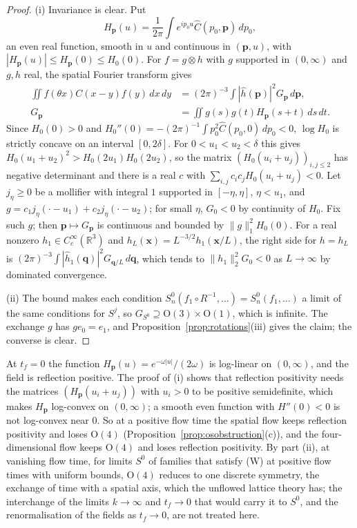 \documentclass[aps,prd,twocolumn,superscriptaddress,nofootinbib,longbibliography,floatfix,amsmath,amssymb,10pt]{revtex4-2}
\theoremstyle{definition}
\theoremstyle{remark}
\newcommand{\R}{\mathbb{R}}
\begin{document}
\begin{proof}
(i) Invariance is clear. Put
\[
H_{\mathbf p}(u)=\frac1{2\pi}\int e^{ip_0u}\widehat C(p_0,\mathbf p)
\,dp_0 ,
\]
an even real function, smooth
in $u$ and continuous in $(\mathbf p,u)$, with $|H_{\mathbf p}(u)|\le
H_{\mathbf p}(0)\le H_0(0)$. For $f=g\otimes h$ with $g$ supported in
$(0,\infty)$ and $g,h$ real, the spatial Fourier transform gives
\[
\begin{split}
\iint f(\theta x)C(x-y)f(y)\,dx\,dy
&=(2\pi)^{-3}\!\int|\hat h(\mathbf p)|^2G_{\mathbf p}\,d\mathbf p,\\
G_{\mathbf p}&=\iint g(s)g(t)H_{\mathbf p}(s+t)\,ds\,dt .
\end{split}
\]
Since $H_0(0)>0$ and $H_0''(0)=-(2\pi)^{-1}\int p_0^2\widehat C(p_0,0)
\,dp_0<0$, $\log H_0$ is strictly concave on an interval $[0,2\delta]$.
For $0<u_1<u_2<\delta$ this gives $H_0(u_1+u_2)^2>H_0(2u_1)H_0(2u_2)$, so
the matrix $(H_0(u_i+u_j))_{i,j\le2}$ has negative determinant and there
is a real $c$ with $\sum_{i,j}c_ic_jH_0(u_i+u_j)<0$. Let $j_\eta\ge0$ be a
mollifier with integral $1$ supported in $[-\eta,\eta]$, $\eta<u_1$, and
$g=c_1j_\eta(\cdot-u_1)+c_2j_\eta(\cdot-u_2)$; for small $\eta$,
$G_0<0$ by continuity of $H_0$. Fix such $g$; then $\mathbf p\mapsto
G_{\mathbf p}$ is continuous and bounded by $\|g\|_1^2H_0(0)$. For a real
nonzero $h_1\in C^\infty_c(\R^3)$ and $h_L(\mathbf x)=L^{-3/2}h_1(\mathbf
x/L)$, the right side for $h=h_L$ is $(2\pi)^{-3}\int|\hat h_1(\mathbf
q)|^2G_{\mathbf q/L}\,d\mathbf q$, which tends to $\|h_1\|_2^2G_0<0$ as
$L\to\infty$ by dominated convergence.

(ii) The bound makes each condition $S^0_n(f_1\circ R^{-1},\dots)=
S^0_n(f_1,\dots)$ a limit of the same conditions for $S^j$, so
$G_{S^0}\supseteq\mathrm O(3)\times\mathrm O(1)$, which is infinite. The
exchange $g$ has $ge_0=e_1$, and Proposition~\ref{prop:rotations}(iii)
gives the claim; the converse is clear.
\end{proof}

At $t_f=0$ the function $H_{\mathbf p}(u)=e^{-\omega|u|}/(2\omega)$ is
log-linear on $(0,\infty)$, and the field is reflection positive. The
proof of (i) shows that reflection positivity needs the matrices
$(H_{\mathbf p}(u_i+u_j))$ with $u_i>0$ to be positive semidefinite, which
makes $H_{\mathbf p}$ log-convex on $(0,\infty)$; a smooth even function
with $H''(0)<0$ is not log-convex near $0$. So at a positive
flow time the spatial flow keeps reflection positivity and loses
$\mathrm O(4)$ (Proposition~\ref{prop:osobstruction}(c)), and the
four-dimensional flow keeps $\mathrm O(4)$ and loses reflection
positivity. By part (ii), at vanishing flow time, for limits $S^0$ of
families that satisfy (W) at positive flow times with uniform bounds,
$\mathrm O(4)$ reduces to one discrete symmetry, the exchange of time with
a spatial axis, which the unflowed lattice theory has; the interchange of
the limits $k\to\infty$ and $t_f\to0$ that would carry it to $S^0$, and the
renormalisation of the fields as $t_f\to0$, are not treated here.
\end{document}
